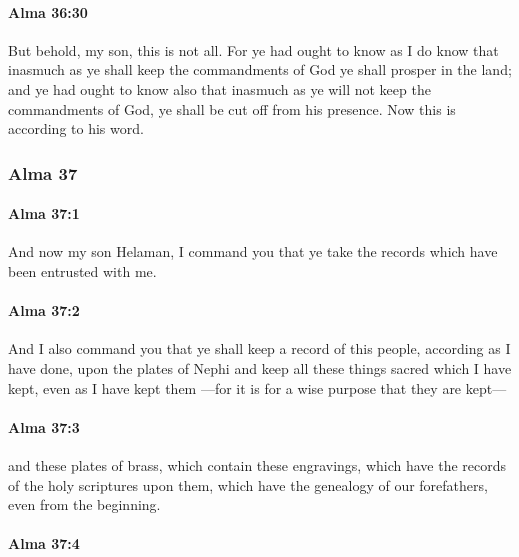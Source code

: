 		\paragraph{Alma 36:30} %
			\label{ALMA-36-30}

			But behold, my son, this is not all.
			For ye had ought to know as I do know
			that inasmuch as ye shall keep the commandments of God
			ye shall prosper in the land;
			and ye had ought to know also
			that inasmuch as ye will not keep the commandments of God,
			ye shall be cut off from his presence.
			Now this is according to his word.

	\subsubsection{Alma 37} %
		\label{ALMA-37}
		
		\paragraph{Alma 37:1} %
			\label{ALMA-37-1}

			And now my son Helaman,
			I command you that ye take the records
			which have been entrusted with me.

		\paragraph{Alma 37:2} %
			\label{ALMA-37-2}

			And I also command you
			that ye shall keep a record of this people,
			according as I have done,
			upon the plates of Nephi
			and keep all these things sacred which I have kept,
			even as I have kept them
			---for it is for a wise purpose that they are kept---

		\paragraph{Alma 37:3} %
			\label{ALMA-37-3}

			and these plates of brass, which contain these engravings,
			which have the records of the holy scriptures upon them,
			which have the genealogy of our forefathers, even from the beginning.

		\paragraph{Alma 37:4} %
			\label{ALMA-37-4}

